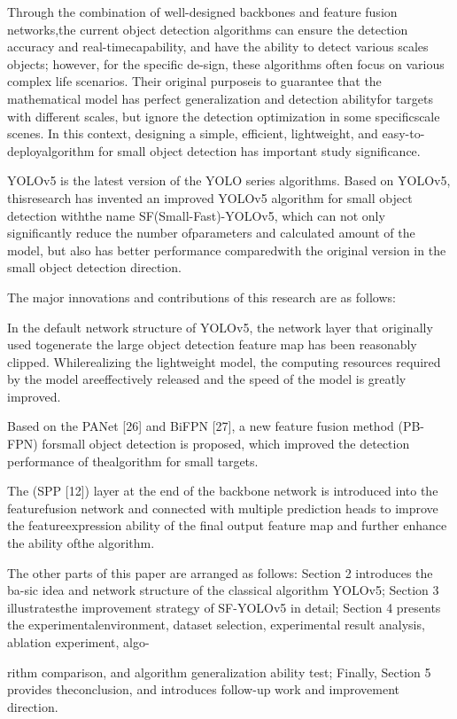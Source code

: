 \documentclass[
  10
]{article}
\begin{document}
Through the combination of well-designed backbones and feature fusion
networks,the current object detection algorithms can ensure the
detection accuracy and real-timecapability, and have the ability to
detect various scales objects; however, for the specific de-sign, these
algorithms often focus on various complex life scenarios. Their original
purposeis to guarantee that the mathematical model has perfect
generalization and detection abilityfor targets with different scales,
but ignore the detection optimization in some specificscale scenes. In
this context, designing a simple, efficient, lightweight, and
easy-to-deployalgorithm for small object detection has important study
significance.

YOLOv5 is the latest version of the YOLO series algorithms. Based on
YOLOv5, thisresearch has invented an improved YOLOv5 algorithm for small
object detection withthe name SF(Small-Fast)-YOLOv5, which can not only
significantly reduce the number ofparameters and calculated amount of
the model, but also has better performance comparedwith the original
version in the small object detection direction.

The major innovations and contributions of this research are as follows:

In the default network structure of YOLOv5, the network layer that
originally used togenerate the large object detection feature map has
been reasonably clipped. Whilerealizing the lightweight model, the
computing resources required by the model areeffectively released and
the speed of the model is greatly improved.

Based on the PANet {[}26{]} and BiFPN {[}27{]}, a new feature fusion
method (PB-FPN) forsmall object detection is proposed, which improved
the detection performance of thealgorithm for small targets.

The (SPP {[}12{]}) layer at the end of the backbone network is
introduced into the featurefusion network and connected with multiple
prediction heads to improve the featureexpression ability of the final
output feature map and further enhance the ability ofthe algorithm.

The other parts of this paper are arranged as follows: Section 2
introduces the ba-sic idea and network structure of the classical
algorithm YOLOv5; Section 3 illustratesthe improvement strategy of
SF-YOLOv5 in detail; Section 4 presents the experimentalenvironment,
dataset selection, experimental result analysis, ablation experiment,
algo-

rithm comparison, and algorithm generalization ability test; Finally,
Section 5 provides theconclusion, and introduces follow-up work and
improvement direction.
\end{document}
